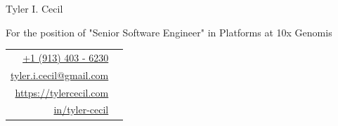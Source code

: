 \documentclass[sans, a4paper, 11pt]{article}
\newcommand{\cvcolor}[1]{{\color{MidnightBlue}#1}}
\begin{document}
\noindent
\begin{minipage}{0.6\linewidth}
 {
 \fontsize{40pt}{50pt}\selectfont
 \noindent
 {Tyler I. Cecil}}\\
 {\Large \color{darkgray} {
   \vspace{-0.75em}

   \noindent
   For the position of "Senior Software Engineer" in Platforms at 10x Genomis
 }}
\end{minipage}
\hfill
{
\begin{tabular}{|rl}
  \href{tel:+1 (913) 403 - 6230}{+1 (913) 403 - 6230}&\cvcolor{\faPhone} \\
  \href{mailto:tyler.i.cecil@gmail.com}{tyler.i.cecil@gmail.com}&\cvcolor{\faEnvelope} \\
  \href{https://tylercecil.com}{https://tylercecil.com}&\cvcolor{\faGlobe} \\
  \href{https://linkedin.com/in/tyler-cecil}{in/tyler-cecil}& \cvcolor{\faLinkedinSquare}\\
\end{tabular}
}

\vspace{0.5em}
\hline
\vspace{2em}
\end{document}
